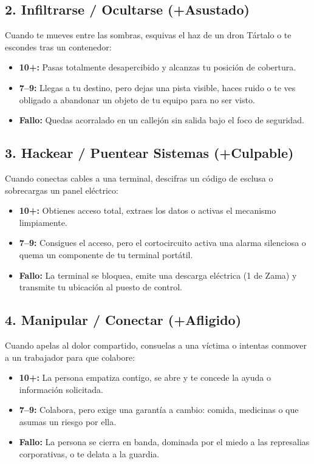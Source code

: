 \subsection{2. Infiltrarse / Ocultarse (+Asustado)}
Cuando te mueves entre las sombras, esquivas el haz de un dron Tártalo o te escondes tras un contenedor:
\begin{itemize}
  \item \textbf{10+:} Pasas totalmente desapercibido y alcanzas tu posición de cobertura.
  \item \textbf{7--9:} Llegas a tu destino, pero dejas una pista visible, haces ruido o te ves obligado a abandonar un objeto de tu equipo para no ser visto.
  \item \textbf{Fallo:} Quedas acorralado en un callejón sin salida bajo el foco de seguridad.
\end{itemize}

\subsection{3. Hackear / Puentear Sistemas (+Culpable)}
Cuando conectas cables a una terminal, descifras un código de esclusa o sobrecargas un panel eléctrico:
\begin{itemize}
  \item \textbf{10+:} Obtienes acceso total, extraes los datos o activas el mecanismo limpiamente.
  \item \textbf{7--9:} Consigues el acceso, pero el cortocircuito activa una alarma silenciosa o quema un componente de tu terminal portátil.
  \item \textbf{Fallo:} La terminal se bloquea, emite una descarga eléctrica (1 de Zama) y transmite tu ubicación al puesto de control.
\end{itemize}

\subsection{4. Manipular / Conectar (+Afligido)}
Cuando apelas al dolor compartido, consuelas a una víctima o intentas conmover a un trabajador para que colabore:
\begin{itemize}
  \item \textbf{10+:} La persona empatiza contigo, se abre y te concede la ayuda o información solicitada.
  \item \textbf{7--9:} Colabora, pero exige una garantía a cambio: comida, medicinas o que asumas un riesgo por ella.
  \item \textbf{Fallo:} La persona se cierra en banda, dominada por el miedo a las represalias corporativas, o te delata a la guardia.
\end{itemize}

